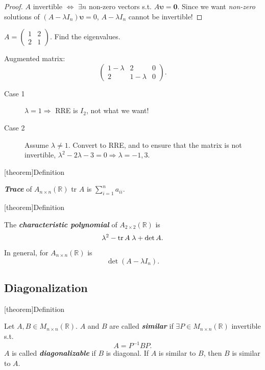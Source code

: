 \documentclass[12pt]{report}
\theoremstyle{definition}
\begin{document}
\begin{proof}
    $A$ invertible $\iff$ $\exists n$ non-zero vectors s.t. $A\mathbf{\upsilon} = \mathbf{0}$.
    Since we want \emph{non-zero} solutions of $(A - \lambda I_n)\mathbf{\upsilon} = 0$,
    $A - \lambda I_n$ cannot be invertible!
\end{proof}

\begin{ex}
    $A = \begin{pmatrix}
        1 & 2\\
        2 & 1
    \end{pmatrix}$. Find the eigenvalues.

    Augmented matrix:\[
        \begin{pmatrix}
            1 - \lambda & 2 & 0 \\
            2 & 1 - \lambda & 0
        \end{pmatrix}.
    \]
    \begin{description}
        \item[Case 1] $\lambda = 1 \Rightarrow{}$ RRE is $I_2$, not what we want!
        \item[Case 2] Assume $\lambda \neq 1$. Convert to RRE,
            and to ensure that the matrix is not invertible,
            $\lambda^{2} - 2\lambda - 3 = 0 \Rightarrow{} \lambda = -1, 3$.
    \end{description}
\end{ex}

[theorem]{Definition}
\begin{trace of A}
    \textbf{\emph{Trace}} of $A_{n\times n}(\mathbb{R})$ tr $A$ is $\sum_{i=1}^{n} a_{ii}$.
\end{trace of A}

[theorem]{Definition}
\begin{characteristic polynomial}
    The \textbf{\emph{characteristic polynomial}} of $A_{2\times 2}(\mathbb{R})$ is\[
        \lambda^{2} - \textnormal{tr}\,A\;\lambda + \det{A}.
    \]In general, for $A_{n\times n}(\mathbb{R})$ is\[
    \det{(A - \lambda I_n)}.
    \]
\end{characteristic polynomial}

\subsection{Diagonalization}

[theorem]{Definition}
\begin{diagonalization}
    Let $A,B \in M_{n\times n}(\mathbb{R})$. $A$ and $B$ are called \textbf{\emph{similar}} if
    $\exists P \in M_{n\times n}(\mathbb{R})$ invertible s.t.\[
        A = P^{-1}BP.
    \]
    $A$ is called \textbf{\emph{diagonalizable}} if $B$ is diagonal.
    If $A$ is similar to $B$, then $B$ is similar to $A$.
\end{diagonalization}
\end{document}

